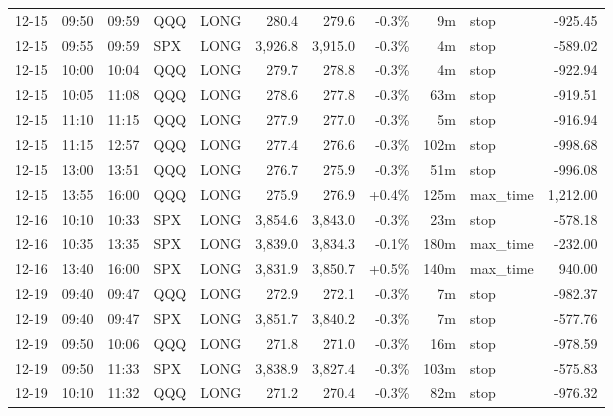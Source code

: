 \documentclass[11pt,a4paper,twoside]{article}
\begin{document}
\begin{center}
\begin{longtable}{>{\color{txtmain}}l l l l l r r r r >{\color{txtmain}}l r}
12-15 & 09:50 & 09:59 & QQQ & LONG & 280.4 & 279.6 & \textcolor{lossred}{-0.3\%} & 9m & stop & \textcolor{lossred}{-925.45} \\
12-15 & 09:55 & 09:59 & SPX & LONG & 3,926.8 & 3,915.0 & \textcolor{lossred}{-0.3\%} & 4m & stop & \textcolor{lossred}{-589.02} \\
12-15 & 10:00 & 10:04 & QQQ & LONG & 279.7 & 278.8 & \textcolor{lossred}{-0.3\%} & 4m & stop & \textcolor{lossred}{-922.94} \\
12-15 & 10:05 & 11:08 & QQQ & LONG & 278.6 & 277.8 & \textcolor{lossred}{-0.3\%} & 63m & stop & \textcolor{lossred}{-919.51} \\
12-15 & 11:10 & 11:15 & QQQ & LONG & 277.9 & 277.0 & \textcolor{lossred}{-0.3\%} & 5m & stop & \textcolor{lossred}{-916.94} \\
12-15 & 11:15 & 12:57 & QQQ & LONG & 277.4 & 276.6 & \textcolor{lossred}{-0.3\%} & 102m & stop & \textcolor{lossred}{-998.68} \\
12-15 & 13:00 & 13:51 & QQQ & LONG & 276.7 & 275.9 & \textcolor{lossred}{-0.3\%} & 51m & stop & \textcolor{lossred}{-996.08} \\
12-15 & 13:55 & 16:00 & QQQ & LONG & 275.9 & 276.9 & \textcolor{wingreen}{+0.4\%} & 125m & max\_time & \textcolor{wingreen}{1,212.00} \\
12-16 & 10:10 & 10:33 & SPX & LONG & 3,854.6 & 3,843.0 & \textcolor{lossred}{-0.3\%} & 23m & stop & \textcolor{lossred}{-578.18} \\
12-16 & 10:35 & 13:35 & SPX & LONG & 3,839.0 & 3,834.3 & \textcolor{lossred}{-0.1\%} & 180m & max\_time & \textcolor{lossred}{-232.00} \\
12-16 & 13:40 & 16:00 & SPX & LONG & 3,831.9 & 3,850.7 & \textcolor{wingreen}{+0.5\%} & 140m & max\_time & \textcolor{wingreen}{940.00} \\
12-19 & 09:40 & 09:47 & QQQ & LONG & 272.9 & 272.1 & \textcolor{lossred}{-0.3\%} & 7m & stop & \textcolor{lossred}{-982.37} \\
12-19 & 09:40 & 09:47 & SPX & LONG & 3,851.7 & 3,840.2 & \textcolor{lossred}{-0.3\%} & 7m & stop & \textcolor{lossred}{-577.76} \\
12-19 & 09:50 & 10:06 & QQQ & LONG & 271.8 & 271.0 & \textcolor{lossred}{-0.3\%} & 16m & stop & \textcolor{lossred}{-978.59} \\
12-19 & 09:50 & 11:33 & SPX & LONG & 3,838.9 & 3,827.4 & \textcolor{lossred}{-0.3\%} & 103m & stop & \textcolor{lossred}{-575.83} \\
12-19 & 10:10 & 11:32 & QQQ & LONG & 271.2 & 270.4 & \textcolor{lossred}{-0.3\%} & 82m & stop & \textcolor{lossred}{-976.32} \\

\end{longtable}
\end{center}
\end{document}
